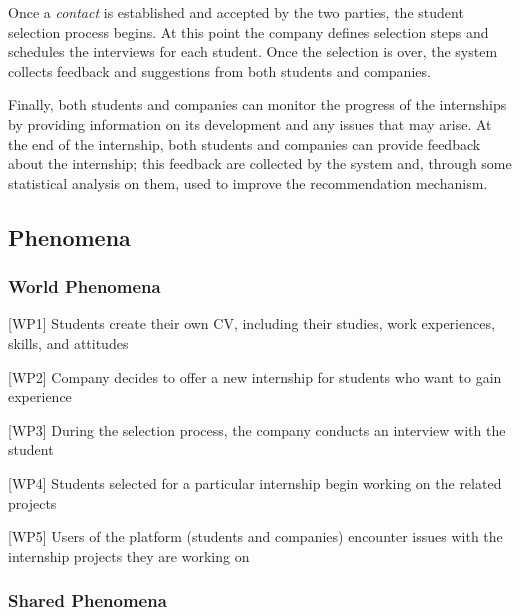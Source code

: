 		Once a \emph{contact} is established and accepted by the two parties, the student selection process begins. At this point the company defines selection steps and schedules the interviews for each student. Once the selection is over, the system collects feedback and suggestions from both students and companies.
		
		Finally, both students and companies can monitor the progress of the internships by providing information on its development and any issues that may arise. At the end of the internship, both students and companies can provide feedback about the internship; this feedback are collected by the system and, through some statistical analysis on them, used to improve the recommendation mechanism.
		\subsection{Phenomena}
			\subsubsection{World Phenomena}
				[WP1] Students create their own CV, including their studies, work experiences, skills, and attitudes
				
				[WP2] Company decides to offer a new internship for students who want to gain experience
				
				[WP3] During the selection process, the company conducts an interview with the student
				
				[WP4] Students selected for a particular internship begin working on the related projects
				
				[WP5] Users of the platform (students and companies) encounter issues with the internship projects they are working on
			\subsubsection{Shared Phenomena}
